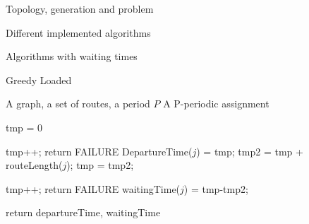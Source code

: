 \documentclass[10pt]{article}
\begin{document}
\begin{section}{Topology, generation and problem}
\begin{subsection}{Different implemented algorithms}
\begin{subsection}{Algorithms with waiting times}
\begin{subsubsection}{Greedy Loaded}
   	\begin{algorithm}[H]
 	\caption{Greedy Loaded}
 	\begin{algorithmic}
 	\REQUIRE A graph, a set of routes, a period $P$
	\ENSURE A P-periodic assignment

	
	\STATE tmp = $0$
	
 	
 	\STATE tmp++;
	\STATE return FAILURE
	\ENDIF
 	\ENDWHILE
	\STATE DepartureTime($j$) = tmp;
	\STATE tmp2 = tmp + routeLength($j$);
	\STATE tmp = tmp2;
	
 	
 	\STATE tmp++;
	\STATE return FAILURE
	\ENDIF
 	\ENDWHILE
	\STATE waitingTime($j$) = tmp-tmp2;
	\ENDIF
 	\ENDFOR

 	\ENDFOR
	\STATE return departureTime, waitingTime

 	\end{algorithmic}
 	\end{algorithm}

    \end{subsubsection}
  \end{subsection}
\end{subsection}
\end{section}


\end{document}

